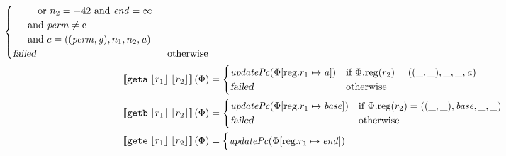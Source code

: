 \documentclass[a4paper]{article}
\newcommand{\update}[2]{[#1 \mapsto #2]}
\newcommand{\sem}[1]{\left\llbracket #1 \right\rrbracket}
\newcommand{\var}[1]{\mathit{#1}}
\newcommand{\gl}{\var{g}}
\newcommand{\addr}{\var{a}}
\newcommand{\start}{\var{base}}
\newcommand{\addrend}{\var{end}}
\newcommand{\inftyend}{-42}
\newcommand{\perm}{\var{perm}}
\newcommand{\plainproj}[1]{\mathrm{#1}}
\newcommand{\memreg}[1][\Phi]{#1.\plainproj{reg}}
\newcommand{\updateReg}[3][\Phi]{#1\update{\plainproj{reg}.#2}{#3}}
\newcommand{\failed}{\textsl{failed}}
\newcommand{\plainfun}[2]{
  \ifthenelse{\equal{#2}{}}
  {\mathit{#1}}
  {\mathit{#1}(#2)}
}
\newcommand{\stdUpdatePc}[1]{\plainfun{updatePc}{#1}}
\newcommand{\refreg}[1]{\lfloor #1 \rfloor}
\newcommand{\zinstr}[1]{\mathtt{#1}}
\newcommand{\twoinstr}[3]{\zinstr{#1} \; #2 \; #3}
\newcommand{\geta}[2]{\twoinstr{geta}{#1}{#2}}
\newcommand{\getb}[2]{\twoinstr{getb}{#1}{#2}}
\newcommand{\gete}[2]{\twoinstr{gete}{#1}{#2}}
\newcommand{\plainperm}[1]{\mathrm{#1}}
\newcommand{\entry}{\plainperm{e}}
\begin{document}
\begin{align*}
\begin{cases}
\begin{array}[t]{l}
                                                \quad\quad\text{or $n_2=\inftyend$ and $\addrend = \infty$}\\
                                                \quad\text{and $\perm \neq \entry$}\\
                                                \quad\text{and $c = ((\perm,\gl),n_1,n_2,\addr)$}
                                              \end{array} \\
                                              \failed & \text{otherwise}
                                            \end{cases}
  \\
  \sem{\geta{\refreg{r_1}}{\refreg{r_2}}}(\Phi) & = 
                                            \begin{cases}
                                              \stdUpdatePc{\updateReg{r_1}{\addr}} &
                                              \arraycolsep=0pt
                                              \begin{array}[t]{l}
                                                \text{if $\memreg(r_2) = ((\_,\_),\_,\_,\addr)$}
                                              \end{array} \\
                                              \failed & \text{otherwise}
                                            \end{cases}
  \\
  \sem{\getb{\refreg{r_1}}{\refreg{r_2}}}(\Phi) & = 
                                            \begin{cases}
                                              \stdUpdatePc{\updateReg{r_1}{\start}} &
                                              \arraycolsep=0pt
                                              \begin{array}[t]{l}
                                                \text{if $\memreg(r_2) = ((\_,\_),\start,\_,\_)$}
                                              \end{array} \\
                                              \failed & \text{otherwise}
                                            \end{cases}
  \\
  \sem{\gete{\refreg{r_1}}{\refreg{r_2}}}(\Phi) & = 
                                            \begin{cases}
                                              \stdUpdatePc{\updateReg{r_1}{\addrend}} &

\end{cases}
\end{align*}
\end{document}
